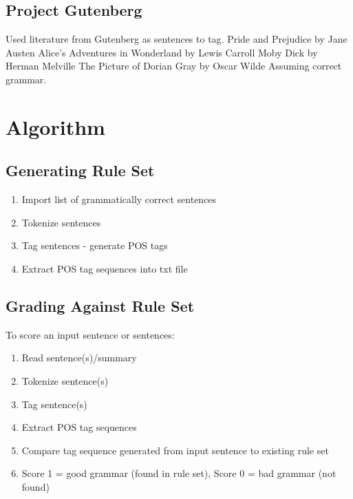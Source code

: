 \documentclass[12pt,a4paper]{article}
\begin{document}
\subsection{Project Gutenberg}

Used literature from Gutenberg as sentences to tag. 
Pride and Prejudice by Jane Austen
Alice's Adventures in Wonderland by Lewis Carroll
Moby Dick by Herman Melville
The Picture of Dorian Gray by Oscar Wilde 
Assuming correct grammar.


\section{Algorithm}


\subsection{Generating Rule Set}

\begin{enumerate}
   \item Import list of grammatically correct sentences
   \item Tokenize sentences
   \item Tag sentences - generate POS tags
   \item Extract POS tag sequences into txt file
  \end{enumerate}

\subsection{Grading Against Rule Set}
 To score an input sentence or sentences:
 
\begin{enumerate}
   \item Read sentence(s)/summary
   \item Tokenize sentence(s)
   \item Tag sentence(s) 
   \item Extract POS tag sequences
   \item Compare tag sequence generated from input sentence to existing rule set
   \item Score 1 = good grammar (found in rule set), Score 0 = bad grammar (not found)
  \end{enumerate}
\end{document}
